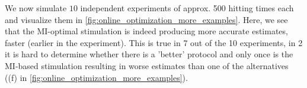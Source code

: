 \documentclass{article}
\begin{document}
\clearpage

We now simulate $10$ independent experiments of approx. 500 hitting times each
and visualize them in \cref{fig:online_optimization_more_examples}. Here, we see
that the MI-optimal stimulation is indeed producing more accurate
estimates, faster (earlier in the experiment). This is true in 7 out of the 10
experiments, in 2 it is hard to determine whether there is a 'better' protocol
and only once is the MI-based stimulation resulting in worse estimates than one
of the alternatives ((f) in \cref{fig:online_optimization_more_examples}). 
 
\begin{figure}[h]
\begin{center}
\\
\end{center}
\end{figure}
\end{document}
